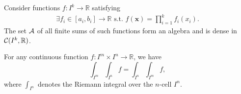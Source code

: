 \begin{lem}
  \label{lem:factoredFunc}
  Consider functions $f: I^k\rightarrow \mathbb{R}$
  satisfying
  \begin{equation}
    \label{eq:factoredFunc}
    \begin{array}{l}
      \exists f_i\in[a_i,b_i]\rightarrow \mathbb{R} \text{ s.t. }
      f(\mathbf{x}) = \prod_{i=1}^k f_i(x_i).
    \end{array}
  \end{equation}
  The set ${\cal A}$ of all finite sums of such functions
  form an algebra and is dense in ${\cal C}(I^k,\mathbb{R})$.
\end{lem}

\begin{coro}%
  \label{coro:FubiniOnKcell}
  For any continuous function $f: I^m\times I^n \rightarrow \mathbb{R}$,
  we have
  \begin{equation}
    \label{eq:FubiniOnKcell}
    \int_{I^m} \int_{I^n} f = \int_{I^n} \int_{I^m} f,
  \end{equation}
  where $\int_{I^n}$ denotes the Riemann integral
  over the $n$-cell $I^n$.
\end{coro}




